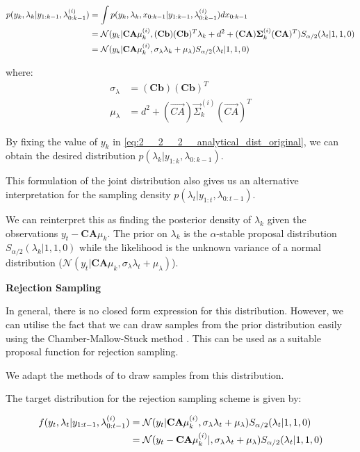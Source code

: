 \documentclass[../main.tex]{subfiles}
\begin{document}
\begin{align}
p(y_k, \lambda_k | y_{1:k-1}, \lambda_{0:k-1}^{(i)}) &= \int p(y_k, \lambda_k, x_{0:k-1} | y_{1:k-1}, \lambda_{0:k-1}^{(i)}) d x_{0:k-1}\notag \\
&=  \mathcal{N}(y_k | \mathbf{CA} \mu_k^{(i)} , (\mathbf{Cb})(\mathbf{Cb})^T\lambda_k + d^2 + (\vec{CA})\vec{\Sigma}_k^{(i)}(\vec{CA})^T) S_{\alpha/2} (\lambda_t | 1,1,0) \notag \\
&= \mathcal{N}(y_k | \mathbf{CA} \mu_k^{(i)} , \sigma_\lambda \lambda_k + \mu_\lambda) S_{\alpha/2} (\lambda_t | 1,1,0)
\label{eq:2__2__2__analytical_dist_original}
\end{align}

where: 
\begin{align*}
\sigma_\lambda &= (\mathbf{Cb})(\mathbf{Cb})^T \\
\mu_\lambda &= d^2 + (\vec{CA})\vec{\Sigma}_k^{(i)}(\vec{CA})^T
\end{align*}



By fixing the value of $y_k$ in \autoref{eq:2__2__2__analytical_dist_original}, we can obtain the desired distribution $p(\lambda_k | y_{1:k}, \lambda_{0:k-1})$. 

This formulation of the joint distribution also gives us an alternative interpretation for the sampling density $p(\lambda_t | y_{1:t}, \lambda_{0:t-1})$. 

We can reinterpret this as finding the posterior density of $\lambda_k$ given the observations $y_t - \textbf{CA}\mu_k$. The prior on $\lambda_k$ is the $\alpha$-stable proposal distribution $S_{\alpha/2} (\lambda_k | 1,1,0)$ while the likelihood is the unknown variance of a normal distribution ($\mathcal{N}(y_t | \mathbf{CA} \mu_k , \sigma_\lambda \lambda_t + \mu_\lambda)$).

\textbf{Rejection Sampling}

In general, there is no closed form expression for this distribution. However, we can utilise the fact that we can draw samples from the prior distribution easily using the Chamber-Mallow-Stuck method \cite{chambers1976method}. This can be used as a suitable proposal function for rejection sampling. 

We adapt the methods of \cite{godsill1999bayesian} to draw samples from this distribution.

The target distribution for the rejection sampling scheme is given by:

\begin{align}
f(y_t, \lambda_t | y_{1:t-1}, \lambda_{0:t-1}^{(i)}) & = \mathcal{N}(y_t | \mathbf{CA} \mu_k^{(i)} , \sigma_\lambda \lambda_t + \mu_\lambda) S_{\alpha/2} (\lambda_t | 1,1,0) \notag \\
& = \mathcal{N}(y_t - \mathbf{CA} \mu_k^{(i)}|  , \sigma_\lambda \lambda_t + \mu_\lambda) S_{\alpha/2} (\lambda_t | 1,1,0) \notag
\end{align}
\end{document}
